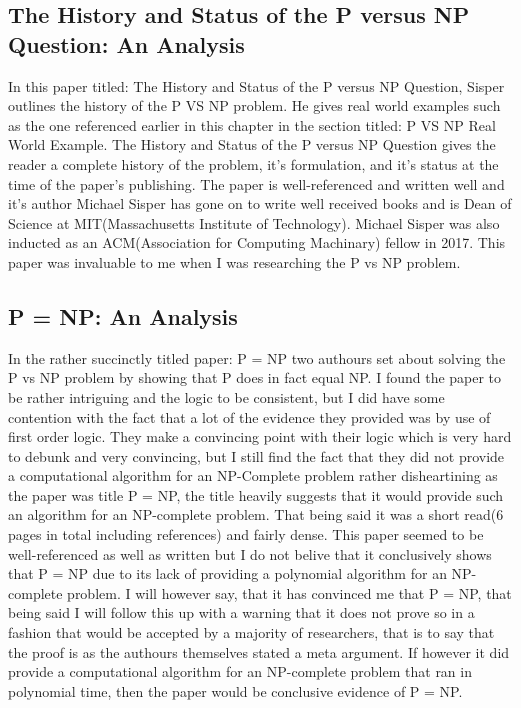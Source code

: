 \documentclass{report}
\begin{document}
\subsection{The History and Status of the P versus NP Question: An Analysis}
In this paper titled: The History and Status of the P versus NP Question\cite{HistoryOfPVsNP}, Sisper outlines the history of the P VS NP problem.  He gives real world examples such as the one referenced earlier in this chapter in the section titled: P VS NP Real World Example.  The History and Status of the P versus NP Question gives the reader a complete history of the problem, it's formulation, and it's status at the time of the paper's publishing.  The paper is well-referenced and written well and it's author Michael Sisper has gone on to write well received books\cite{Sisperbib} and is Dean of Science at MIT(Massachusetts Institute of Technology)\cite{Sisperdean}.  Michael Sisper was also inducted as an ACM(Association for Computing Machinary) fellow in 2017\cite{Sisperacm}. This paper was invaluable to me when I was researching the P vs NP problem.
\subsection{P = NP: An Analysis}
In the rather succinctly titled paper: P = NP\cite{PVsNPSolved} two authours set about solving the P vs NP problem by showing that P does in fact equal NP.  I found the paper to be rather intriguing and the logic to be consistent, but I did have some contention with the fact that a lot of the evidence they provided was by use of first order logic.  They make a convincing point with their logic which is very hard to debunk and very convincing, but I still find the fact that they did not provide a computational algorithm for an NP-Complete problem rather disheartining as the paper was title P = NP, the title heavily suggests that it would provide such an algorithm for an NP-complete problem.  That being said it was a short read(6 pages in total including references) and fairly dense.  This paper seemed to be well-referenced as well as written but I do not belive that it conclusively shows that P = NP due to its lack of providing a polynomial algorithm for an NP-complete problem.  I will however say, that it has convinced me that P = NP, that being said I will follow this up with a warning that it does not prove so in a fashion that would be accepted by a majority of researchers, that is to say that the proof is as the authours themselves stated a meta argument.  If however it did provide a computational algorithm for an NP-complete problem that ran in polynomial time, then the paper would be conclusive evidence of P = NP.
\end{document}

